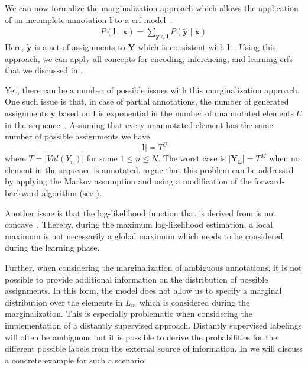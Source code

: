 \bigskip

We can now formalize the marginalization approach which allows the application of an incomplete annotation $\bm{l}$ to a \gls{crf} model~\citep{tsuboi2008training}:
\begin{equation}
  \label{equ:crf-marginalization}
  \begin{split}
    P\left(\bm{l}\mid\mathbf{x}\right)=\sum_{\mathbf{\tilde{y}}\in\bm{l}}P\left(\mathbf{\tilde{y}}\mid\mathbf{x}\right)
  \end{split}
\end{equation}
Here, $\mathbf{\tilde{y}}$ is a set of assignments to $\mathbf{Y}$ which is consistent with $\bm{l}$~\citep{tsuboi2008training}.
Using this approach, we can apply all concepts for encoding, inferencing, and learning \glspl{crf} that we discussed in .

\bigskip

Yet, there can be a number of possible issues with this marginalization approach.
One such issue is that, in case of partial annotations, the number of generated assignments $\mathbf{\tilde{y}}$ based on ${\bm{l}}$ is exponential in the number of unannotated elements $U$ in the sequence~\citep{tsuboi2008training}.
Assuming that every unannotated element has the same number of possible assignments we have
\begin{equation}
  \label{equ:marginalization-number-of-assingments}
  |\bm{l}|=T^U
\end{equation}
where $T=|Val\left(Y_n\right)|$ for some $1\leq n\leq N$.
The worst case is $|\mathbf{Y}_{\mathbf{L}}|=T^M$ when no element in the sequence is annotated.
\citep{tsuboi2008training} argue that this problem can be addressed by applying the Markov assumption and using a modification of the forward-backward algorithm (see ).


Another issue is that the log-likelihood function that is derived from  is not concave~\citep{tsuboi2008training}.
Thereby, during the maximum log-likelihood estimation, a local maximum is not necessarily a global maximum which needs to be considered during the learning phase.

Further, when considering the marginalization of ambiguous annotations, it is not possible to provide additional information on the distribution of possible assignments.
In this form, the model does not allow us to specify a \gls{marginal distribution} over the elements in $L_m$ which is considered during the marginalization.
This is especially problematic when considering the implementation of a distantly supervised approach.
Distantly supervised labelings will often be ambiguous but it is possible to derive the probabilities for the different possible labels from the external source of information.
In  we will discuss a concrete example for such a scenario.

